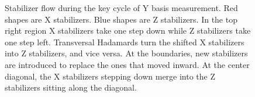 \documentclass[onecolumn,unpublished,a4paper]{quantumarticle}
\theoremstyle{definition}
\theoremstyle{definition}
\theoremstyle{definition}
\begin{document}
\begin{figure}
    \centering
    \caption{
        Stabilizer flow during the key cycle of Y basis measurement.
        Red shapes are X stabilizers.
        Blue shapes are Z stabilizers.
        In the top right region X stabilizers take one step down while Z stabilizers take one step left.
        Transversal Hadamards turn the shifted X stabilizers into Z stabilizers, and vice versa.
        At the boundaries, new stabilizers are introduced to replace the ones that moved inward.
        At the center diagonal, the X stabilizers stepping down merge into the Z stabilizers sitting along the diagonal.
    }
    \label{fig:patch_diagonal_twist}
\end{figure}
\end{document}
